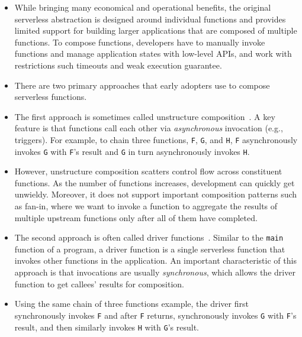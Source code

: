 \begin{itemize}

	\item While bringing many economical and operational benefits, the original
	serverless abstraction is designed around individual functions and
	provides limited support for building larger applications that are
	composed of multiple functions. To compose functions, developers have to
	manually invoke functions and manage application states with low-level
	APIs, and work with restrictions such timeouts and weak execution guarantee.

	\item There are two primary approaches that early adopters use to compose
	serverless functions.

	\item The first approach is sometimes called unstructure
	composition~\cite{netherite}. A key feature is that functions call each
	other via \emph{asynchronous} invocation (e.g., triggers). For example, to
	chain three functions, \texttt{F}, \texttt{G}, and \texttt{H}, \texttt{F}
	asynchronously invokes \texttt{G} with \texttt{F}'s result and \texttt{G}
	in turn asynchronously invokes \texttt{H}.

	\item However, unstructure composition scatters control flow across
	constituent functions. As the number of functions increases, development
	can quickly get unwieldy. Moreover, it does not support important
	composition patterns such as fan-in, where we want to invoke a function to
	aggregate the results of multiple upstream functions only after all of
	them have completed.


	\item The second approach is often called driver functions~\cite{beldi}.
	Similar to the \texttt{main} function of a program, a driver function is a
	single serverless function that invokes other functions in the
	application. An important characteristic of this approach is that
	invocations are usually \emph{synchronous}, which allows the driver
	function to get callees' results for composition.

	\item Using the same chain of three functions example, the driver first
	synchronously invokes \texttt{F} and after \texttt{F} returns,
	synchronously invokes \texttt{G} with \texttt{F}'s result, and then
	similarly invokes \texttt{H} with \texttt{G}'s result.


\end{itemize}
